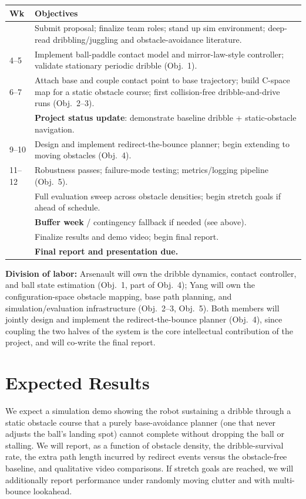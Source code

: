 \documentclass[10pt,twocolumn]{article}
\begin{document}
\begin{table}[h]
\centering
\small
\setlength{\tabcolsep}{4pt}
\begin{tabular}{@{}>{\raggedright\arraybackslash}p{1.05cm}p{6.35cm}@{}}
\toprule
\textbf{Wk} & \textbf{Objectives} \\
\midrule
3 & Submit proposal; finalize team roles; stand up sim environment; deep-read dribbling/juggling and obstacle-avoidance literature. \\
\mbox{4--5} & Implement ball-paddle contact model and mirror-law-style controller; validate stationary periodic dribble (Obj.~1). \\
\mbox{6--7} & Attach base and couple contact point to base trajectory; build C-space map for a static obstacle course; first collision-free dribble-and-drive runs (Obj.~2--3). \\
8 & \textbf{Project status update}: demonstrate baseline dribble + static-obstacle navigation. \\
\mbox{9--10} & Design and implement redirect-the-bounce planner; begin extending to moving obstacles (Obj.~4). \\
\mbox{11--12} & Robustness passes; failure-mode testing; metrics/logging pipeline (Obj.~5). \\
13 & Full evaluation sweep across obstacle densities; begin stretch goals if ahead of schedule. \\
14 & \textbf{Buffer week} / contingency fallback if needed (see above). \\
15 & Finalize results and demo video; begin final report. \\
16 & \textbf{Final report and presentation due.} \\
\bottomrule
\end{tabular}
\end{table}

\noindent\textbf{Division of labor:} Arsenault will own the dribble dynamics,
contact controller, and ball state estimation (Obj.~1, part of Obj.~4);
Yang will own the configuration-space obstacle mapping, base path
planning, and simulation/evaluation infrastructure (Obj.~2--3, Obj.~5).
Both members will jointly design and implement the redirect-the-bounce
planner (Obj.~4), since coupling the two halves of the system is the core
intellectual contribution of the project, and will co-write the final
report.

\section{Expected Results}
We expect a simulation demo showing the robot sustaining a dribble through
a static obstacle course that a purely base-avoidance planner (one that
never adjusts the ball's landing spot) cannot complete without dropping the
ball or stalling. We will report, as a function of obstacle density, the
dribble-survival rate, the extra path length incurred by redirect events
versus the obstacle-free baseline, and qualitative video comparisons. If
stretch goals are reached, we will additionally report performance under
randomly moving clutter and with multi-bounce lookahead.
\end{document}
